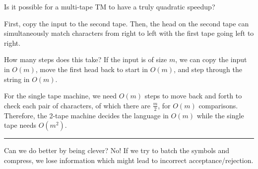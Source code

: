 \documentclass[twoside]{article}
\newenvironment{proof}{{\bf Proof:}}{\hfill\rule{2mm}{2mm}}
\begin{document}
Is it possible for a multi-tape TM to have a truly quadratic speedup?


\begin{proof}
	
	First, copy the input to the second tape.  Then, the head on the second tape can simultaneously match characters from right to left with the first tape going left to right.
	
	How many steps does this take?  If the input is of size $m$, we can copy the input in $O(m)$, move the first head back to start in $O(m)$, and step through the string in $O(m)$.
	
	For the single tape machine, we need $O(m)$ steps to move back and forth to check each pair of characters, of which there are $\frac{m}{2}$, for $O(m)$ comparisons.  Therefore, the 2-tape machine decides the language in $O(m)$ while the single tape needs $O(m^2)$.
	

	
\end{proof}

Can we do better by being clever?  No!  If we try to batch the symbols and compress, we lose information which might lead to incorrect acceptance/rejection.
\end{document}
